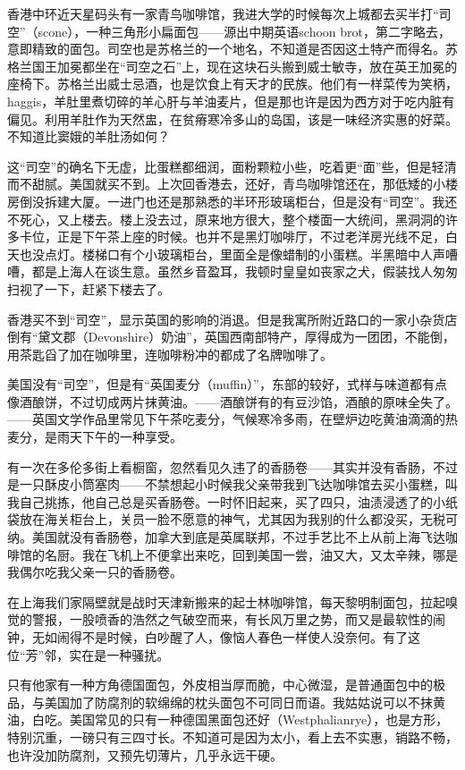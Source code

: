 \par 香港中环近天星码头有一家青鸟咖啡馆，我进大学的时候每次上城都去买半打“司空”（scone），一种三角形小扁面包——源出中期英语schoon brot，第二字略去，意即精致的面包。司空也是苏格兰的一个地名，不知道是否因这土特产而得名。苏格兰国王加冕都坐在“司空之石”上，现在这块石头搬到威士敏寺，放在英王加冕的座椅下。苏格兰出威士忌酒，也是饮食上有天才的民族。他们有一样菜传为笑柄，haggis，羊肚里煮切碎的羊心肝与羊油麦片，但是那也许是因为西方对于吃内脏有偏见。利用羊肚作为天然盅，在贫瘠寒冷多山的岛国，该是一味经济实惠的好菜。不知道比窦娥的羊肚汤如何？
\par 这“司空”的确名下无虚，比蛋糕都细润，面粉颗粒小些，吃着更“面”些，但是轻清而不甜腻。美国就买不到。上次回香港去，还好，青鸟咖啡馆还在，那低矮的小楼房倒没拆建大厦。一进门也还是那熟悉的半环形玻璃柜台，但是没有“司空”。我还不死心，又上楼去。楼上没去过，原来地方很大，整个楼面一大统间，黑洞洞的许多卡位，正是下午茶上座的时候。也并不是黑灯咖啡厅，不过老洋房光线不足，白天也没点灯。楼梯口有个小玻璃柜台，里面全是像蜡制的小蛋糕。半黑暗中人声嘈嘈，都是上海人在谈生意。虽然乡音盈耳，我顿时皇皇如丧家之犬，假装找人匆匆扫视了一下，赶紧下楼去了。
\par 香港买不到“司空”，显示英国的影响的消退。但是我寓所附近路口的一家小杂货店倒有“黛文郡（Devonshire）奶油”，英国西南部特产，厚得成为一团团，不能倒，用茶匙舀了加在咖啡里，连咖啡粉冲的都成了名牌咖啡了。
\par 美国没有“司空”，但是有“英国麦分（muffin）”，东部的较好，式样与味道都有点像酒酿饼，不过切成两片抹黄油。——酒酿饼有的有豆沙馅，酒酿的原味全失了。——英国文学作品里常见下午茶吃麦分，气候寒冷多雨，在壁炉边吃黄油滴滴的热麦分，是雨天下午的一种享受。
\par 有一次在多伦多街上看橱窗，忽然看见久违了的香肠卷——其实并没有香肠，不过是一只酥皮小筒塞肉——不禁想起小时候我父亲带我到飞达咖啡馆去买小蛋糕，叫我自己挑拣，他自己总是买香肠卷。一时怀旧起来，买了四只，油渍浸透了的小纸袋放在海关柜台上，关员一脸不愿意的神气，尤其因为我别的什么都没买，无税可纳。美国就没有香肠卷，加拿大到底是英属联邦，不过手艺比不上从前上海飞达咖啡馆的名厨。我在飞机上不便拿出来吃，回到美国一尝，油又大，又太辛辣，哪是我偶尔吃我父亲一只的香肠卷。
\par 在上海我们家隔壁就是战时天津新搬来的起士林咖啡馆，每天黎明制面包，拉起嗅觉的警报，一股喷香的浩然之气破空而来，有长风万里之势，而又是最软性的闹钟，无如闹得不是时候，白吵醒了人，像恼人春色一样使人没奈何。有了这位“芳”邻，实在是一种骚扰。
\par 只有他家有一种方角德国面包，外皮相当厚而脆，中心微湿，是普通面包中的极品，与美国加了防腐剂的软绵绵的枕头面包不可同日而语。我姑姑说可以不抹黄油，白吃。美国常见的只有一种德国黑面包还好（Westphalianrye），也是方形，特别沉重，一磅只有三四寸长。不知道可是因为太小，看上去不实惠，销路不畅，也许没加防腐剂，又预先切薄片，几乎永远干硬。

